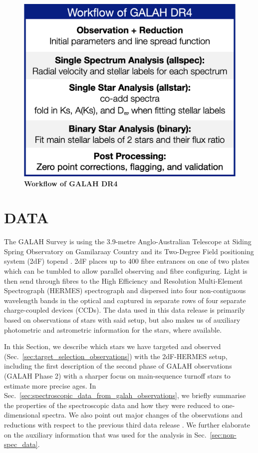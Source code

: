 \documentclass[
  journal=pasa,
  manuscript=research-paper, %
  year=2023,
  volume=37
]{cup-journal}
\begin{document}
\begin{figure}[hbt]
 \centering
 \includegraphics[width=\textwidth]{figures/workflow_galah_dr4.png}
 \caption{\textbf{Workflow of GALAH DR4}}
 \label{fig:workflow_galah_dr4}
\end{figure}

\section{DATA}
\label{sec:data}

The GALAH Survey is using the 3.9-metre Anglo-Australian Telescope at Siding Spring Observatory on Gamilaraay Country and its Two-Degree Field positioning system (2dF) topend \citep{Lewis2002}. 2dF places up to 400 fibre entrances on one of two plates which can be tumbled to allow parallel observing and fibre configuring. Light is then send through fibres to the High Efficiency and Resolution Multi-Element Spectrograph (HERMES) spectrograph \citep{Barden2010, Brzeski2011, Heijmans2012, Farrell2014, Sheinis2015} and dispersed into four non-contiguous wavelength bands in the optical and captured in separate rows of four separate charge-coupled devices (CCDs). The data used in this data release is primarily based on observations of stars with said setup, but also makes us of auxiliary photometric and astrometric information for the stars, where available.

In this Section, we describe which stars we have targeted and observed (Sec.~\ref{sec:target_selection_observations}) with the 2dF-HERMES setup, including the first description of the second phase of GALAH observations (GALAH Phase 2) with a sharper focus on main-sequence turnoff stars to estimate more precise ages. In Sec.~\ref{sec:spectroscopic_data_from_galah_observations}, we briefly summarise the properties of the spectroscopic data and how they were reduced to one-dimensional spectra. We also point out major changes of the observations and reductions with respect to the previous third data release \citep{Buder2021}. We further elaborate on the auxiliary information that was used for the analysis in Sec.~\ref{sec:non-spec_data}.
\end{document}
